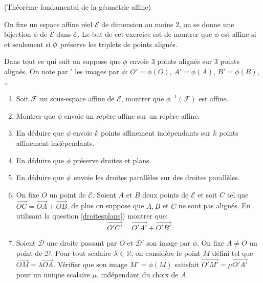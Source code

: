 \documentclass[a4paper,12pt,reqno]{amsart}
\begin{document}
\begin{exo} (Théorème fondamental de la géométrie affine)

  On fixe un espace affine réel $\mathcal{E}$ de dimension au moins $2$, on se donne une bijection $\phi$ de $\mathcal{E}$ dans $\mathcal{E}$. Le but de cet exercice est de montrer que $\phi$ est affine si et seulement si $\text{\ensuremath{\phi}}$ préserve les triplets de points alignés.

  \begin{convention}
    Dans tout ce qui suit on suppose que $\phi$ envoie $3$ points alignés sur $3$ points alignés. On note par ${}'$ les images par $\phi$: $O'=\phi(O)$, $A'=\phi(A)$, $B'=\phi(B)$, \ldots
  \end{convention}

  \begin{enumerate}
    \item Soit $\mathcal{F}$ un sous-espace affine de $\mathcal{E}$, montrer que $\phi^{-1}(\mathcal{F})$ est affine.

    \item Montrer que $\phi$ envoie un repère affine sur un repère affine.

    \item En déduire que $\phi$ envoie $k$ points affinement indépendants sur $k$ points affinement indépendants.

    \item En déduire que $\phi$ préserve droites et plans.

    \item \label{droitesplans} En déduire que $\text{\ensuremath{\phi}}$ envoie les droites parallèles sur des droites parallèles.

    \item On fixe $O$ un point de $\mathcal{E}$. Soient $A$ et $B$ deux points de $\mathcal{E}$ et soit $C$ tel que $\overrightarrow{OC}=\overrightarrow{OA}+\overrightarrow{OB}$, de plus on suppose que $A,B$ et $C$ ne sont pas alignés. En utilisant la question \ref{droitesplans}) montrer que:\vspace{-3mm}
      \[
        \overrightarrow{O'C'}=\overrightarrow{O'A'}+\overrightarrow{O'B'}
      \]

    \item Soient $\mathcal{D}$ une droite passant par $O$ et $\mathcal{D}'$ son image par $\phi$. On fixe $A\neq O$ un point de $\mathcal{D}$. Pour tout scalaire $\lambda\in\mathbb{R}$, on considère le point $M$ défini tel que $ \overrightarrow{OM}=\lambda\overrightarrow{OA}$.\newline
    Vérifier que son image $M'=\phi(M)$ satisfait $\overrightarrow{O'M'}=\mu\overrightarrow{O'A'}$ pour un unique scalaire $\mu$, indépendant du choix de $A$.


\end{enumerate}
\end{exo}
\end{document}
